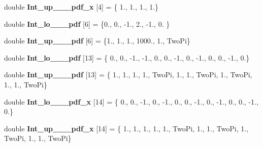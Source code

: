 \begin{DoxyCompactItemize}
\item 
\hypertarget{namespaceIntLimits_a405d520ea75f6e1869cf105361a32a1e}{}double {\bfseries Int\+\_\+up\+\_\+\_\+\_\+pdf\+\_\+x} \mbox{[}4\mbox{]} = \{ 1., 1., 1., 1.\}\label{namespaceIntLimits_a405d520ea75f6e1869cf105361a32a1e}

\item 
\hypertarget{namespaceIntLimits_ad43ecb88ae590bc86f805609065415dc}{}double {\bfseries Int\+\_\+lo\+\_\+\_\+\_\+pdf} \mbox{[}6\mbox{]} = \{0., 0., -\/1., 2., -\/1., 0. \}\label{namespaceIntLimits_ad43ecb88ae590bc86f805609065415dc}

\item 
\hypertarget{namespaceIntLimits_a2d3fd9f962096bdb83ddde6e339b11a3}{}double {\bfseries Int\+\_\+up\+\_\+\_\+\_\+pdf} \mbox{[}6\mbox{]} = \{1., 1., 1., 1000., 1., Two\+Pi\}\label{namespaceIntLimits_a2d3fd9f962096bdb83ddde6e339b11a3}

\item 
\hypertarget{namespaceIntLimits_abd60cdb336bae950d56afad4f67a7f7c}{}double {\bfseries Int\+\_\+lo\+\_\+\_\+\_\+pdf} \mbox{[}13\mbox{]} = \{ 0., 0., -\/1., -\/1., 0., 0., -\/1., 0., -\/1., 0., 0., -\/1., 0.\}\label{namespaceIntLimits_abd60cdb336bae950d56afad4f67a7f7c}

\item 
\hypertarget{namespaceIntLimits_a55d13c6b15f51997943c22861e72f028}{}double {\bfseries Int\+\_\+up\+\_\+\_\+\_\+pdf} \mbox{[}13\mbox{]} = \{ 1., 1., 1., 1., Two\+Pi, 1., 1., Two\+Pi, 1., Two\+Pi, 1., 1., Two\+Pi\}\label{namespaceIntLimits_a55d13c6b15f51997943c22861e72f028}

\item 
\hypertarget{namespaceIntLimits_a0bd33a34c3322bc5beb22dcff8ff5fea}{}double {\bfseries Int\+\_\+lo\+\_\+\_\+\_\+pdf\+\_\+x} \mbox{[}14\mbox{]} = \{ 0., 0., -\/1., 0., -\/1., 0., 0., -\/1., 0., -\/1., 0., 0., -\/1., 0.\}\label{namespaceIntLimits_a0bd33a34c3322bc5beb22dcff8ff5fea}

\item 
\hypertarget{namespaceIntLimits_a3d36c9fbb051e0f30cbdfc7b36894bb2}{}double {\bfseries Int\+\_\+up\+\_\+\_\+\_\+pdf\+\_\+x} \mbox{[}14\mbox{]} = \{ 1., 1., 1., 1., 1., Two\+Pi, 1., 1., Two\+Pi, 1., Two\+Pi, 1., 1., Two\+Pi\}\label{namespaceIntLimits_a3d36c9fbb051e0f30cbdfc7b36894bb2}


\end{DoxyCompactItemize}

